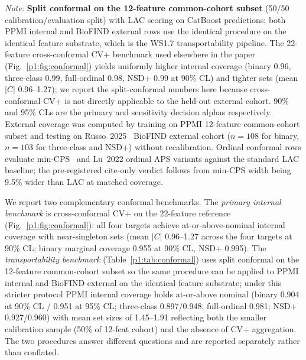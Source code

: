 \documentclass[10pt,letterpaper]{article}
\begin{document}
\begin{table}[!t]
\raggedright\scriptsize\textit{Note:} \textbf{Split conformal on the 12-feature common-cohort subset} (50/50 calibration/evaluation split) with LAC scoring on CatBoost predictions; both PPMI internal and BioFIND external rows use the identical procedure on the identical feature substrate, which is the WS1.7 transportability pipeline. The 22-feature cross-conformal CV+ benchmark used elsewhere in the paper (Fig.~\ref{p1:fig:conformal}) yields uniformly higher internal coverage (binary 0.96, three-class 0.99, full-ordinal 0.98, NSD+ 0.99 at 90\% CL) and tighter sets (mean $|C|$ 0.96--1.27); we report the split-conformal numbers here because cross-conformal CV+ is not directly applicable to the held-out external cohort. 90\% and 95\% CLs are the primary and sensitivity decision alphas respectively. External coverage was computed by training on PPMI 12-feature common-cohort subset and testing on Russo~2025~\cite{russo2025} BioFIND external cohort ($n{=}108$ for binary, $n{=}103$ for three-class and NSD+) without recalibration. Ordinal conformal rows evaluate min-CPS~\cite{zhang2025ordinalcp} and Lu~2022 ordinal APS variants against the standard LAC baseline; the pre-registered cite-only verdict follows from min-CPS width being 9.5\% wider than LAC at matched coverage.
\end{table}

We report two complementary conformal benchmarks. The \emph{primary internal benchmark} is cross-conformal CV+ on the 22-feature reference (Fig.~\ref{p1:fig:conformal}): all four targets achieve at-or-above-nominal internal coverage with near-singleton sets (mean $|C|$ 0.96--1.27 across the four targets at 90\% CL; binary marginal coverage 0.955 at 90\% CL, NSD+ 0.995). The \emph{transportability benchmark} (Table~\ref{p1:tab:conformal}) uses split conformal on the 12-feature common-cohort subset so the same procedure can be applied to PPMI internal and BioFIND external on the identical feature substrate; under this stricter protocol PPMI internal coverage holds at-or-above nominal (binary 0.904 at 90\% CL / 0.951 at 95\% CL; three-class 0.897/0.948; full-ordinal 0.981; NSD+ 0.927/0.960) with mean set sizes of 1.45--1.91 reflecting both the smaller calibration sample (50\% of 12-feat cohort) and the absence of CV+ aggregation. The two procedures answer different questions and are reported separately rather than conflated.
\end{document}

